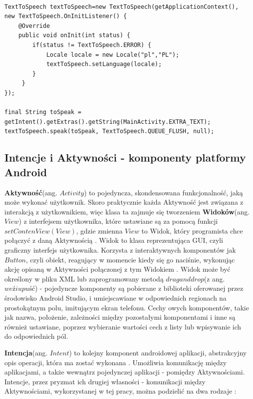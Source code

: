 \documentclass[eng,oneside]{mgr}
\begin{document}
\begin{lstlisting}[caption={Kod programu, który odpowiada za przeczytanie tekstu z wykorzystaniem klasy TextToSpeech}]

TextToSpeech textToSpeech=new TextToSpeech(getApplicationContext(),
new TextToSpeech.OnInitListener() {
    @Override
    public void onInit(int status) {
        if(status != TextToSpeech.ERROR) {
            Locale locale = new Locale("pl","PL");
            textToSpeech.setLanguage(locale);
        }
     }
});

final String toSpeak = getIntent().getExtras().getString(MainActivity.EXTRA_TEXT);
textToSpeech.speak(toSpeak, TextToSpeech.QUEUE_FLUSH, null);
\end{lstlisting}

\subsection{Intencje i Aktywności - komponenty platformy Android}
\textbf{Aktywność}(ang. $Activity$) to pojedyncza, skondensowana funkcjonalność, jaką może wykonać użytkownik. Skoro praktycznie każda Aktywność jest związana z interakcją z użytkownikiem, więc klasa ta zajmuje się tworzeniem \textbf{Widoków}(ang. $View$) z interfejsem użytkownika, które ustawiane są za pomocą funkcji $setContenView(View)$, gdzie zmienna $View$ to Widok, który programista chce połączyć z daną Aktywnością \cite{activity}. Widok to klasa reprezentująca GUI, czyli graficzny interfejs użytkownika. Korzysta z interaktywnych komponentów jak $Button$, czyli obiekt, reagujący w momencie kiedy się go naciśnie, wykonując akcję opisaną w Aktywności połączonej z tym Widokiem \cite{view}. Widok może być określony w pliku XML lub zaprogramowany metodą $drag and drop$(z ang. $weź i upuść$) - pojedyncze komponenty są pobierane z biblioteki oferowanej przez środowisko Android Studio, i umiejscawiane w odpowiednich regionach na prostokątnym polu, imitującym ekran telefonu. Cechy owych komponentów, takie jak nazwa, położenie, zależności między pozostałymi komponentami i inne są również ustawiane, poprzez wybieranie wartości cech z listy lub wpisywanie ich do odpowiednich pól.
\par \textbf{Intencja}(ang. $Intent$) to kolejny komponent androidowej aplikacji, abstrakcyjny opis operacji, która ma zostać wykonana \cite{intents}. Umożliwia komunikację między aplikacjami, a także wewnątrz pojedynczej aplikacji - pomiędzy Aktywnościami. Intencje, przez pryzmat ich drugiej własności - komunikacji między Aktywnościami, wykorzystanej w tej pracy, można podzielić na dwa rodzaje \cite{android4devs}:
\end{document}
